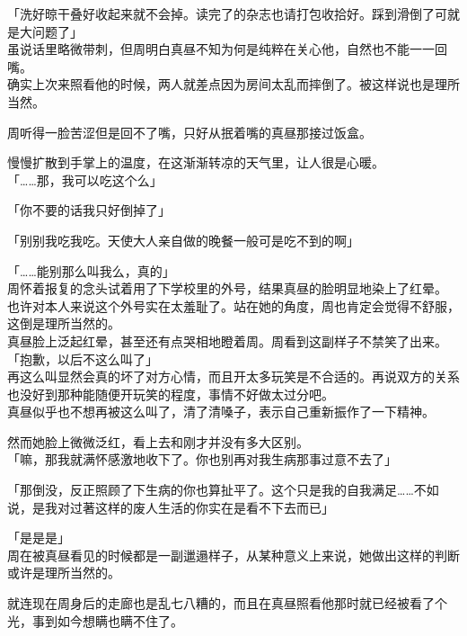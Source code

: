 「洗好晾干叠好收起来就不会掉。读完了的杂志也请打包收拾好。踩到滑倒了可就是大问题了」\\

虽说话里略微带刺，但周明白真昼不知为何是纯粹在关心他，自然也不能一一回嘴。\\

确实上次来照看他的时候，两人就差点因为房间太乱而摔倒了。被这样说也是理所当然。

周听得一脸苦涩但是回不了嘴，只好从抿着嘴的真昼那接过饭盒。

慢慢扩散到手掌上的温度，在这渐渐转凉的天气里，让人很是心暖。\\

「……那，我可以吃这个么」

「你不要的话我只好倒掉了」

「别别我吃我吃。天使大人亲自做的晚餐一般可是吃不到的啊」

「……能别那么叫我么，真的」\\

周怀着报复的念头试着用了下学校里的外号，结果真昼的脸明显地染上了红晕。\\

也许对本人来说这个外号实在太羞耻了。站在她的角度，周也肯定会觉得不舒服，这倒是理所当然的。\\

真昼脸上泛起红晕，甚至还有点哭相地瞪着周。周看到这副样子不禁笑了出来。\\

「抱歉，以后不这么叫了」\\

再这么叫显然会真的坏了对方心情，而且开太多玩笑是不合适的。再说双方的关系也没好到那种能随便开玩笑的程度，事情不好做太过分吧。\\

真昼似乎也不想再被这么叫了，清了清嗓子，表示自己重新振作了一下精神。

然而她脸上微微泛红，看上去和刚才并没有多大区别。\\

「嘛，那我就满怀感激地收下了。你也别再对我生病那事过意不去了」

「那倒没，反正照顾了下生病的你也算扯平了。这个只是我的自我满足……不如说，是我对过著这样的废人生活的你实在是看不下去而已」

「是是是」\\

周在被真昼看见的时候都是一副邋遢样子，从某种意义上来说，她做出这样的判断或许是理所当然的。

就连现在周身后的走廊也是乱七八糟的，而且在真昼照看他那时就已经被看了个光，事到如今想瞒也瞒不住了。\\

